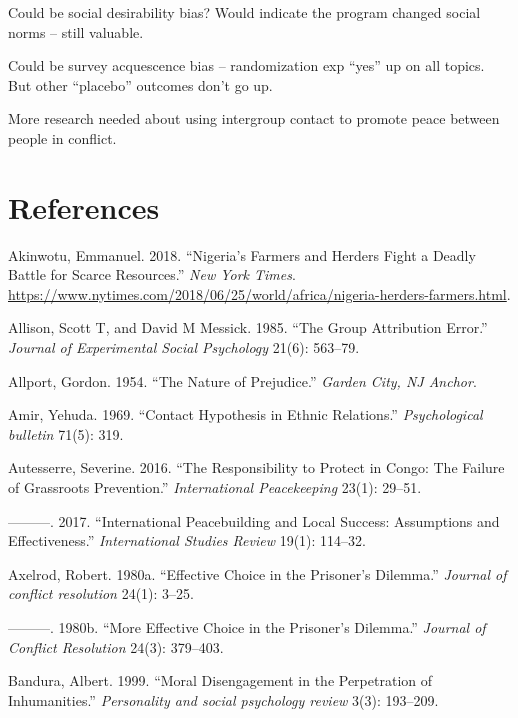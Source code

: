 \documentclass[11pt]{article}
\begin{document}
Could be social desirability bias? Would indicate the program changed
social norms -- still valuable.

Could be survey acquescence bias -- randomization exp ``yes'' up on all
topics. But other ``placebo'' outcomes don't go up.

More research needed about using intergroup contact to promote peace
between people in conflict.

\section*{References}\label{references}

\hypertarget{refs}{}
\hypertarget{ref-nyt2018nigeria}{}
Akinwotu, Emmanuel. 2018. ``Nigeria's Farmers and Herders Fight a Deadly
Battle for Scarce Resources.'' \emph{New York Times}.
\url{https://www.nytimes.com/2018/06/25/world/africa/nigeria-herders-farmers.html}.

\hypertarget{ref-allison1985group}{}
Allison, Scott T, and David M Messick. 1985. ``The Group Attribution
Error.'' \emph{Journal of Experimental Social Psychology} 21(6):
563--79.

\hypertarget{ref-allport1954prejudice}{}
Allport, Gordon. 1954. ``The Nature of Prejudice.'' \emph{Garden City,
NJ Anchor}.

\hypertarget{ref-amir1969contact}{}
Amir, Yehuda. 1969. ``Contact Hypothesis in Ethnic Relations.''
\emph{Psychological bulletin} 71(5): 319.

\hypertarget{ref-autesserre2016failure}{}
Autesserre, Severine. 2016. ``The Responsibility to Protect in Congo:
The Failure of Grassroots Prevention.'' \emph{International
Peacekeeping} 23(1): 29--51.

\hypertarget{ref-autesserre2017international}{}
---------. 2017. ``International Peacebuilding and Local Success:
Assumptions and Effectiveness.'' \emph{International Studies Review}
19(1): 114--32.

\hypertarget{ref-axelrod1980effective}{}
Axelrod, Robert. 1980a. ``Effective Choice in the Prisoner's Dilemma.''
\emph{Journal of conflict resolution} 24(1): 3--25.

\hypertarget{ref-axelrod1980more}{}
---------. 1980b. ``More Effective Choice in the Prisoner's Dilemma.''
\emph{Journal of Conflict Resolution} 24(3): 379--403.

\hypertarget{ref-bandura1999moral}{}
Bandura, Albert. 1999. ``Moral Disengagement in the Perpetration of
Inhumanities.'' \emph{Personality and social psychology review} 3(3):
193--209.
\end{document}
